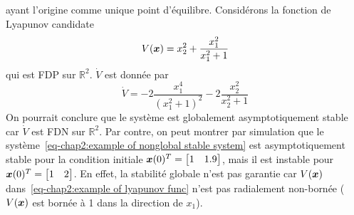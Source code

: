 ayant l'origine comme unique point d'équilibre. Considérons la fonction de Lyapunov candidate
\begin{equation}\label{eq-chap2:example of lyapunov func}
	V(\bm{x}) = x_2^2 + \frac{x_1^2}{x_1^2+1}
\end{equation}
qui est FDP sur $\mathbb{R}^2$. $\dot{V}$ est donnée par 
\begin{equation*}
	\dot{V} = -2\frac{x_1^4}{(x_1^2+1)^2}-2\frac{x_2^2}{x_2^2+1}
\end{equation*}
On pourrait conclure que le système est globalement asymptotiquement stable car $\dot{V}$ est FDN sur $\mathbb{R}^2$. Par contre, on peut montrer par simulation que le système~\eqref{eq-chap2:example of nonglobal stable system} est asymptotiquement stable pour la condition initiale $\bm{x}(0)^T=\begin{bmatrix}
1 & 1.9
\end{bmatrix}$, mais il est instable pour  $\bm{x}(0)^T=\begin{bmatrix}
1 & 2
\end{bmatrix}$. En effet, la stabilité globale n'est pas garantie car $V(\bm{x})$ dans~\eqref{eq-chap2:example of lyapunov func} n'est pas radialement non-bornée ($V(\bm{x})$ est bornée à 1 dans la direction de $x_1$). 

